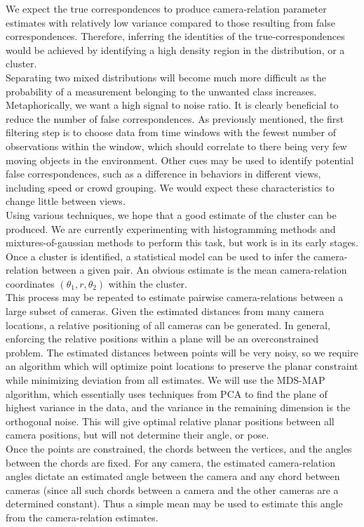 \documentclass[journal]{IEEEtran}
\begin{document}
		\indent We expect the true correspondences to produce camera-relation parameter estimates with relatively low variance compared to those resulting from false correspondences. Therefore, inferring the identities of the true-correspondences would be achieved by identifying a high density region in the distribution, or a cluster. \\
		\indent Separating two mixed distributions will become much more difficult as the probability of a measurement belonging to the unwanted class increases. Metaphorically, we want a high signal to noise ratio. It is clearly beneficial to reduce the number of false correspondences. As previously mentioned, the first filtering step is to choose data from time windows with the fewest number of observations within the window, which should correlate to there being very few moving objects in the environment. Other cues may be used to identify potential false correspondences, such as a difference in behaviors in different views, including speed or crowd grouping. We would expect these characteristics to change little between views. \\
		\indent Using various techniques, we hope that a good estimate of the cluster can be produced. We are currently experimenting with histogramming methods and mixtures-of-gaussian methods to perform this task, but work is in its early stages. \\
		\indent Once a cluster is identified, a statistical model can be used to infer the camera-relation between a given pair. An obvious estimate is the mean camera-relation coordinates $(\theta_1,r,\theta_2)$ within the cluster. \\
		\indent This process may be repeated to estimate pairwise camera-relations between a large subset of cameras. Given the estimated distances from many camera locations, a relative positioning of all cameras can be generated. In general, enforcing the relative positions within a plane will be an overconstrained problem. The estimated distances between points will be very noisy, so we require an algorithm which will optimize point locations to preserve the planar constraint while minimizing deviation from all estimates. We will use the MDS-MAP algorithm, which essentially uses techniques from PCA to find the plane of highest variance in the data, and the variance in the remaining dimension is the orthogonal noise. This will give optimal relative planar positions between all camera positions, but will not determine their angle, or pose. \\
		\indent Once the points are constrained, the chords between the vertices, and the angles between the chords are fixed. For any camera, the estimated camera-relation angles dictate an estimated angle between the camera and any chord between cameras (since all such chords between a camera and the other cameras are a determined constant). Thus a simple mean may be used to estimate this angle from the camera-relation estimates.
\end{document}
